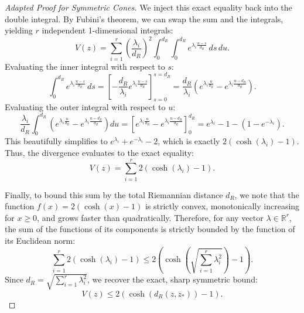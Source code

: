 \begin{proof}[Adapted Proof for Symmetric Cones]
We inject this exact equality back into the double integral. By Fubini's theorem, we can swap the sum and the integrals, yielding $r$ independent 1-dimensional integrals:
\begin{equation}
    V(z) = \sum_{i=1}^r \left( \frac{\lambda_i}{d_R} \right)^2 \int_0^{d_R} \int_0^{d_R} e^{\lambda_i \frac{u-s}{d_R}} \, ds \, du.
\end{equation}
Evaluating the inner integral with respect to $s$:
\begin{equation}
    \int_0^{d_R} e^{\lambda_i \frac{u-s}{d_R}} \, ds = \left[ -\frac{d_R}{\lambda_i} e^{\lambda_i \frac{u-s}{d_R}} \right]_{s=0}^{s=d_R} = \frac{d_R}{\lambda_i} \left( e^{\lambda_i \frac{u}{d_R}} - e^{\lambda_i \frac{u-d_R}{d_R}} \right).
\end{equation}
Evaluating the outer integral with respect to $u$:
\begin{equation}
    \frac{\lambda_i}{d_R} \int_0^{d_R} \left( e^{\lambda_i \frac{u}{d_R}} - e^{\lambda_i \frac{u-d_R}{d_R}} \right) du = \left[ e^{\lambda_i \frac{u}{d_R}} - e^{\lambda_i \frac{u-d_R}{d_R}} \right]_0^{d_R} = e^{\lambda_i} - 1 - (1 - e^{-\lambda_i}).
\end{equation}
This beautifully simplifies to $e^{\lambda_i} + e^{-\lambda_i} - 2$, which is exactly $2(\cosh(\lambda_i) - 1)$. Thus, the divergence evaluates to the exact equality:
\begin{equation}
    V(z) = \sum_{i=1}^r 2(\cosh(\lambda_i) - 1).
\end{equation}

Finally, to bound this sum by the total Riemannian distance $d_R$, we note that the function $f(x) = 2(\cosh(x) - 1)$ is strictly convex, monotonically increasing for $x \ge 0$, and grows faster than quadratically. Therefore, for any vector $\lambda \in \mathbb{R}^r$, the sum of the functions of its components is strictly bounded by the function of its Euclidean norm:
\begin{equation}
    \sum_{i=1}^r 2(\cosh(\lambda_i) - 1) \le 2\left(\cosh\left(\sqrt{\sum_{i=1}^r \lambda_i^2}\right) - 1\right).
\end{equation}
Since $d_R = \sqrt{\sum_{i=1}^r \lambda_i^2}$, we recover the exact, sharp symmetric bound:
\begin{equation}
    V(z) \le 2(\cosh(d_R(z, z_*)) - 1).
\end{equation}
\end{proof}


